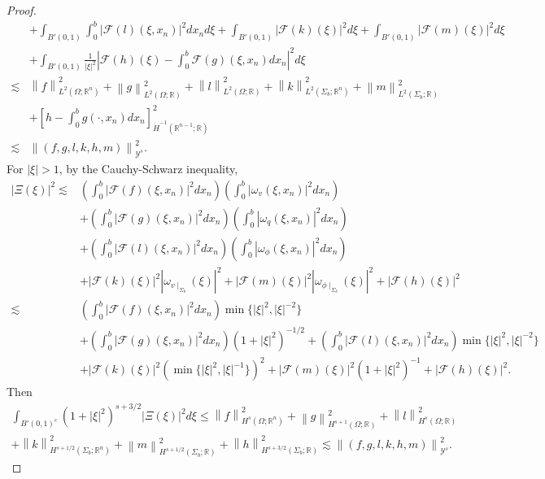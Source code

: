 \documentclass[10pt,a4paper]{amsart}
\newcommand{\abs}[1]{\left\lvert#1\right\rvert}
\newcommand{\norm}[1]{\left\lVert#1\right\rVert}
\begin{document}
\begin{proof}
\begin{align}
        &+\int_{B'(0,1)}\int_{0}^{b}\abs{\mathcal{F}(l)(\xi,x_{n})}^{2}dx_{n}d\xi +\int_{B'(0,1)}\abs{\mathcal{F}(k)(\xi)}^{2}d\xi+\int_{B'(0,1)}\abs{\mathcal{F}(m)(\xi)}^{2}d\xi \nonumber \\
        &+\int_{B'(0,1)}\frac{1}{\abs{\xi}^{2}}\abs{\mathcal{F}(h)(\xi)-\int_{0}^{b}\mathcal{F}(g)(\xi,x_{n})dx_{n}}^{2}d\xi \nonumber\\
        \lesssim& \norm{f}_{L^{2}(\Omega;\mathbb{R}^{n})}^{2}+\norm{g}_{L^{2}(\Omega;\mathbb{R})}^{2}+\norm{l}_{L^{2}(\Omega;\mathbb{R})}^{2}+\norm{k}_{L^{2}(\Sigma_{b};\mathbb{R}^{n})}^{2}+\norm{m}_{L^{2}(\Sigma_{b};\mathbb{R})}^{2} \nonumber\\
        &+\left[h-\int_{0}^{b}g(\cdot,x_{n})dx_{n}\right]_{\dot{H}^{-1}(\mathbb{R}^{n-1};\mathbb{R})}^{2} \nonumber\\
        \lesssim&\norm{(f,g,l,k,h,m)}_{\mathcal{Y}^{s}}^{2}.
    \end{align}
    For \(\abs{\xi}>1\), by the Cauchy-Schwarz inequality,
    \begin{align}
        \abs{\Xi(\xi)}^{2} \lesssim &\left(\int_{0}^{b}\abs{\mathcal{F}(f)(\xi,x_{n})}^{2}dx_{n}\right)\left(\int_{0}^{b}\abs{\omega_{v}(\xi,x_{n})}^{2}dx_{n}\right) \nonumber\\
        &+\left(\int_{0}^{b}\abs{\mathcal{F}(g)(\xi,x_{n})}^{2}dx_{n}\right)\left(\int_{0}^{b}\abs{\omega_{q}(\xi,x_{n})}^{2}dx_{n}\right) \nonumber\\
        &+\left(\int_{0}^{b}\abs{\mathcal{F}(l)(\xi,x_{n})}^{2}dx_{n}\right)\left(\int_{0}^{b}\abs{\omega_{\phi}(\xi,x_{n})}^{2}dx_{n}\right) \nonumber\\
        &+\abs{\mathcal{F}(k)(\xi)}^{2}\abs{\omega_{v\mid_{\Sigma_{b}}}(\xi)}^{2}+\abs{\mathcal{F}(m)(\xi)}^{2}\abs{\omega_{\phi\mid_{\Sigma_{b}}}(\xi)}^{2}+\abs{\mathcal{F}(h)(\xi)}^{2} \nonumber\\
        \lesssim&\left(\int_{0}^{b}\abs{\mathcal{F}(f)(\xi,x_{n})}^{2}dx_{n}\right)\min\{\abs{\xi}^{2},\abs{\xi}^{-2}\} \nonumber\\
        &+\left(\int_{0}^{b}\abs{\mathcal{F}(g)(\xi,x_{n})}^{2}dx_{n}\right)(1+\abs{\xi}^{2})^{-1/2} +\left(\int_{0}^{b}\abs{\mathcal{F}(l)(\xi,x_{n})}^{2}dx_{n}\right)\min\{\abs{\xi}^{2},\abs{\xi}^{-2}\} \nonumber\\
        &+\abs{\mathcal{F}(k)(\xi)}^{2}(\min\{\abs{\xi}^{2},\abs{\xi}^{-1}\})^{2}+\abs{\mathcal{F}(m)(\xi)}^{2}(1+\abs{\xi}^{2})^{-1}+\abs{\mathcal{F}(h)(\xi)}^{2}.
    \end{align}
    Then
\begin{multline}
    \int_{B'(0,1)^{c}}(1+\abs{\xi}^{2})^{s+3/2}\abs{\Xi(\xi)}^{2}d\xi  
        \leq \norm{f}_{H^{s}(\Omega;\mathbb{R}^{n})}^{2}+\norm{g}_{H^{s+1}(\Omega;\mathbb{R})}^{2}+\norm{l}_{H^{s}(\Omega;\mathbb{R})}^{2} \\
         +\norm{k}_{H^{s+1/2}(\Sigma_{b};\mathbb{R}^{n})}^{2}+\norm{m}_{H^{s+1/2}(\Sigma_{b};\mathbb{R})}^{2}+\norm{h}_{H^{s+3/2}(\Sigma_{b};\mathbb{R})}^{2}          \lesssim \norm{(f,g,l,k,h,m)}_{\mathcal{Y}^{s}}^{2}.
\end{multline}
\end{proof}
\end{document}
